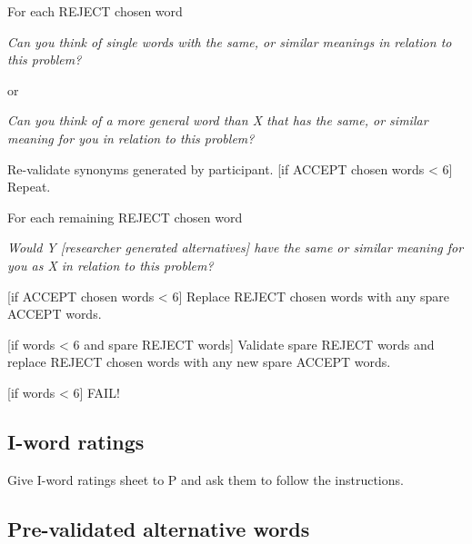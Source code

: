 {\textup{For each REJECT chosen word}}

\textit{Can you think of single words with the same, or similar meanings in relation to this problem?}

or

\textit{Can you think of a more general word than \textup{X} that has
the same, or similar meaning for you in relation to this problem?}


\textup{Re-validate synonyms generated by participant. [if ACCEPT chosen words {\textless} 6] Repeat.}

\textup{For each remaining REJECT chosen word}

\textit{Would \textup{ Y [researcher generated alternatives]} have the same or similar meaning for you as \textup{X
} in relation to this problem?}

\textup{[if ACCEPT chosen words {\textless} 6] Replace REJECT chosen words with any spare
ACCEPT words.}

[if words {\textless} 6 and spare REJECT words] Validate spare REJECT words and replace REJECT chosen words with any new
spare ACCEPT words.

[if words {\textless} 6] FAIL!

\subsection{I-word ratings}

{Give I-word ratings sheet to P and ask them to follow the instructions.}

\subsection{Pre-validated alternative words}

